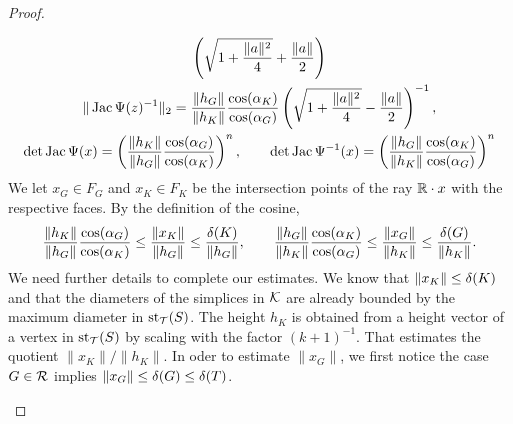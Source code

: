 \documentclass[10pt,a4paper]{article}
\begin{document}
\begin{proof}
\begin{itemize}
\begin{gather*}
            \left( 
                \sqrt{ 1 + \frac{ \|a\|^{2} }{ 4 } } + \frac{ \|a\| }{2}
            \right)
            \\
            \|  \operatorname{{\rm Jac}}\Psi(z)^{-1}  \|_{2}
            = 
            \frac{ \| h_{{G}} \| }{ \| h_K \| }
            \frac{ \cos(\alpha_K) }{ \cos(\alpha_{{G}}) }
            \left( 
                \sqrt{ 1 + \frac{ \|a\|^{2} }{ 4 } } - \frac{ \|a\| }{2}
            \right)^{-1},
            \\
            \det\operatorname{{\rm Jac}}\Psi(x)
            =
            \left( 
            \frac{ \| h_K \| }{ \| h_{{G}} \| }
            \frac{ \cos(\alpha_{{G}}) }{ \cos(\alpha_K) }
            \right)^{n},
            \qquad
            \det\operatorname{{\rm Jac}}\Psi^{-1}(x)
            =
            \left( 
            \frac{ \| h_{{G}} \| }{ \| h_{K} \| }
            \frac{ \cos(\alpha_{K}) }{ \cos(\alpha_{{G}}) }
            \right)^{n}
        \end{gather*}
        We let $x_{G} \in F_{G}$ and $x_{K} \in F_{K}$ be the intersection points of the ray ${\mathbb R} \cdot x$ with the respective faces.
        By the definition of the cosine, 
        \begin{align*}
            \frac{ \| h_K \| }{ \| h_{{G}} \| }
            \frac{ \cos(\alpha_{{G}}) }{ \cos(\alpha_K) }
            \leq 
            \frac{ \| x_K \| }{ \| h_{{G}} \| }
            \leq 
            \frac{ {\delta}(K) }{ \| h_{{G}} \| }
            ,
            \qquad 
            \frac{ \| h_{{G}} \| }{ \| h_K \| }
            \frac{ \cos(\alpha_K) }{ \cos(\alpha_{{G}}) }
            \leq 
            \frac{ \| x_{G} \| }{ \| h_{K} \| }
            \leq 
            \frac{ {\delta}(G) }{ \| h_{K} \| }
            .
        \end{align*}
		We need further details to complete our estimates. 
		We know that $\| x_K \| \leq {\delta}(K)$ and that the diameters of the simplices in ${\mathcal K}$ are already bounded by the maximum diameter in $\operatorname{st}_{{\mathcal T}}(S)$. The height $h_{K}$ is obtained from a height vector of a vertex in $\operatorname{st}_{{\mathcal T}}(S)$ by scaling with the factor $(k+1)^{-1}$.
		That estimates the quotient $\| x_K \| / \| h_K \|$. 
        In oder to estimate $\|x_{G}\|$, we first notice the case $G \in {\mathcal R}$ implies $\|x_{G}\| \leq {\delta}(G) \leq {\delta}(T)$. 

\end{itemize}
\end{proof}
\end{document}
